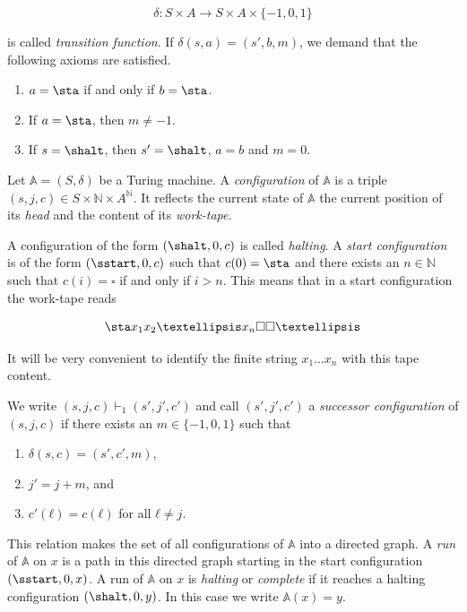 \[δ: S × A → S × A × \lbrace -1, 0, 1 \rbrace\]

is called \emph{transition function}. If \(δ(s, a) = (s', b, m)\), we
demand that the following axioms are satisfied.

\begin{enumerate}
\def\labelenumi{\arabic{enumi}.}
\tightlist
\item
  \(a = \sta\) if and only if \(b = \sta\).
\item
  If \(a = \sta\), then \(m ≠ -1\).
\item
  If \(s = \shalt\), then \(s' = \shalt\), \(a = b\) and \(m = 0\).
\end{enumerate}

Let \(\mathbb A = (S, δ)\) be a Turing machine. A \emph{configuration}
of \(\mathbb A\) is a triple \((s, j, c) ∈ S × ℕ × A^ℕ\). It reflects
the current state of \(\mathbb A\) the current position of its
\emph{head} and the content of its \emph{work-tape}.

A configuration of the form \((\shalt, 0, c)\) is called \emph{halting}.
A \emph{start configuration} is of the form \((\sstart, 0, c)\) such
that \(c(0) = \sta\) and there exists an \(n ∈ ℕ\) such that
\(c(i) = \square\) if and only if \(i > n\). This means that in a start
configuration the work-tape reads

\[\sta x_1 x_2 … x_n \square \square …\]

It will be very convenient to identify the finite string \(x_1…x_n\)
with this tape content.

We write \((s, j, c) \vdash_1 (s', j', c')\) and call \((s', j', c')\) a
\emph{successor configuration} of \((s, j, c)\) if there exists an
\(m ∈ \lbrace -1, 0, 1 \rbrace\) such that

\begin{enumerate}
\def\labelenumi{\arabic{enumi}.}
\tightlist
\item
  \(δ(s, c) = (s', c', m)\),
\item
  \(j' = j + m\), and
\item
  \(c'(ℓ) = c(ℓ)\) for all \(ℓ ≠ j\).
\end{enumerate}

This relation makes the set of all configurations of \(\mathbb A\) into
a directed graph. A \emph{run} of \(\mathbb A\) on \(x\) is a path in
this directed graph starting in the start configuration
\((\sstart, 0, x)\). A run of \(\mathbb A\) on \(x\) is \emph{halting}
or \emph{complete} if it reaches a halting configuration
\((\shalt, 0, y)\). In this case we write \(\mathbb A (x) = y\).

